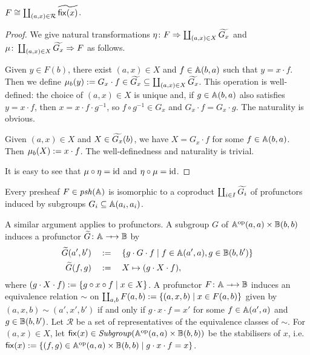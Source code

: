 \begin{proposition}
    \( F \cong \coprod_{(a,x) \in \mathcal{R}} \widetilde{\mathsf{fix}(x)} \).
\end{proposition}
\begin{proof}
    We give natural transformations \( \eta \colon F \Rightarrow \coprod_{(a,x) \in X} \widetilde{G_x} \) and \( \mu \colon \coprod_{(a,x) \in X} \widetilde{G_x} \Rightarrow F \) as follows.

    Given \( y \in F(b) \), there exist \( (a,x) \in X \) and \( f \in \mathbb{A}(b,a) \) such that \( y = x \cdot f \).
    Then we define \( \mu_b(y) := G_x \cdot f \in \widetilde{G_x} \subseteq \coprod_{(a,x) \in X} \widetilde{G_x} \).
    This operation is well-defined: the choice of \( (a,x) \in X \) is unique and, if \( g \in \mathbb{A}(b,a) \) also satisfies \( y = x \cdot f \), then \( x = x \cdot f \cdot g^{-1} \), so \( f \circ g^{-1} \in G_x \) and \( G_x \cdot f = G_x \cdot g \).
    The naturality is obvious.

    Given \( (a,x) \in X \) and \( X \in \widetilde{G_x}(b) \), we have \( X = G_x \cdot f \) for some \( f \in \mathbb{A}(b,a) \).
    Then \( \mu_b(X) := x \cdot f \).
    The well-definedness and naturality is trivial.

    It is easy to see that \( \mu \circ \eta = \mathrm{id} \) and \( \eta \circ \mu = \mathrm{id} \).
\end{proof}
\begin{corollary}
    Every presheaf \( F \in \mathit{psh}(\mathbb{A}) \) is isomorphic to a coproduct \( \coprod_{i \in I} \widetilde{G_i} \) of profunctors induced by subgroups \( G_i \subseteq \mathbb{A}(a_i, a_i) \).
\end{corollary}

A similar argument applies to profunctors.
A subgroup \( G \) of \( \mathbb{A}^{\mathrm{op}}(a,a) \times \mathbb{B}(b,b) \) induces a profunctor \( \InducedProf{G} \colon \Grp \profarrow \Grpb \) by 
\begin{align*}
    \widetilde{G}(a', b')
    &\quad:=\quad
    \{ g \cdot G \cdot f \mid f \in \mathbb{A}(a', a), g \in \mathbb{B}(b, b') \}
    \\
    \widetilde{G}(f, g)
    &\quad:=\quad
    X \mapsto (g \cdot X \cdot f),
\end{align*}
where \( (g \cdot X \cdot f) := \{ g \circ x \circ f \mid x \in X \} \).
A profunctor \( F \colon \Grp \profarrow \Grpb \) induces an equivalence relation \( \sim \) on \( \coprod_{a,b} F(a,b) := \{ (a, x, b) \mid x \in F(a, b) \} \) given by
\( (a, x, b) \sim (a', x', b') \) if and only if \( g \cdot x \cdot f = x' \) for some \( f \in \mathbb{A}(a', a) \) and \( g \in \mathbb{B}(b, b') \).
Let \( \mathcal{R} \) be a set of representatives of the equivalence classes of \( \sim \).
For \( (a, x) \in X \), let \( \mathsf{fix}(x) \in \mathit{Subgroup}(\mathbb{A}^{\mathrm{op}}(a,a) \times \mathbb{B}(b,b)) \) be the stabilisers of \( x \), i.e.~\( \mathsf{fix}(x) := \{ (f,g) \in \mathbb{A}^{\mathrm{op}}(a,a) \times \mathbb{B}(b,b) \mid g \cdot x \cdot f = x \} \).

